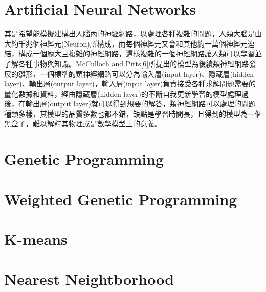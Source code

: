 \section{Artificial Neural Networks}

其是希望能模擬建構出人腦內的神經網路，以處理各種複雜的問題，人類大腦是由大約千兆個神經元(Neuron)所構成，而每個神經元又會和其他約一萬個神經元連結，構成一個龐大且複雜的神經網路，這樣複雜的一個神經網路讓人類可以學習並了解各種事物與知識。McCulloch and Pitts[6]所提出的模型為後續類神經網路發展的雛形，一個標準的類神經網路可以分為輸入層(input layer)、隱藏層(hidden layer)、輸出層(output layer)，輸入層(input layer)負責接受各種求解問題需要的量化數據和資料，經由隱藏層(hidden layer)的不斷自我更新學習的模型處理過後，在輸出層(output layer)就可以得到想要的解答，類神經網路可以處理的問題種類多樣，其模型的品質多數也都不錯，缺點是學習時間長，且得到的模型為一個黑盒子，難以解釋其物理或是數學模型上的意義。

\section{Genetic Programming}
\section{Weighted Genetic Programming}
\section{K-means}
\section{Nearest Neightborhood}
